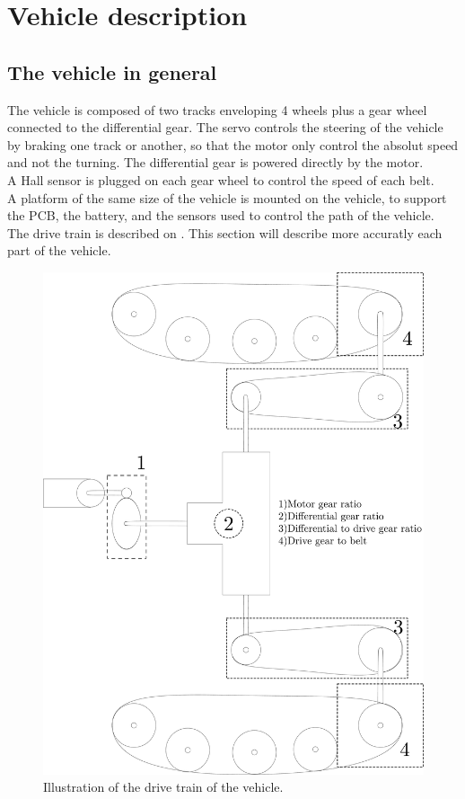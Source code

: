 \section{Vehicle description}

\subsection{The vehicle in general}

The vehicle is composed of two tracks enveloping 4 wheels plus a gear wheel connected to the differential gear. The servo controls the steering of the vehicle by braking one track or another, so that the motor only control the absolut speed and not the turning. The differential gear is powered directly by the motor.\\
A Hall sensor is plugged on each gear wheel to control the speed of each belt.\\
A platform of the same size of the vehicle  is mounted on the vehicle, to support the PCB, the battery, and the sensors used to control the path of the vehicle.\\

The drive train is described on . This section will describe more accuratly each part of the vehicle.


\begin{figure}[H]
	\centering
	\includegraphics[scale=0.2]{figures/vehicleDescriptionDriveTrain.pdf}
	\caption{Illustration of the drive train of the vehicle.}
	\label{vehicleDescriptionDriveTrain}
\end{figure}